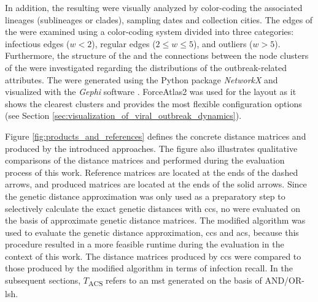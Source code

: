 In addition, the resulting  were visually analyzed by color-coding the associated lineages (sublineages or clades), sampling dates and collection cities. The edges of the  were examined using a color-coding system divided into three categories: infectious edges ($w < 2$), regular edges ($2 \leq w \leq 5$), and outliers ($w > 5$). Furthermore, the structure of the  and the connections between the node clusters of the  were investigated regarding the distributions of the outbreak-related attributes. The  were generated using the Python package \textit{NetworkX} \cite{Net1} and visualized with the \textit{Gephi} software \cite{Gep1}. ForceAtlas2 was used for the layout as it shows the clearest clusters and provides the most flexible configuration options (see Section \ref{sec:visualization_of_viral_outbreak_dynamics}).

Figure \ref{fig:products_and_references} defines the concrete distance matrices and  produced by the introduced approaches. The figure also illustrates qualitative comparisons of the distance matrices and  performed during the evaluation process of this work. Reference matrices are located at the ends of the dashed arrows, and produced matrices are located at the ends of the solid arrows.
Since the genetic distance approximation was only used as a preparatory step to selectively calculate the exact genetic distances with \acrshort{ccs}, no  were evaluated on the basis of approximate genetic distance matrices. The modified algorithm was used to evaluate the genetic distance approximation, \acrshort{ccs} and \acrshort{acs}, because this procedure resulted in a more feasible runtime during the evaluation in the context of this work.
The distance matrices produced by \acrshort{ccs} were compared to those produced by the modified algorithm in terms of infection recall. In the subsequent sections, $T$\textsubscript{ACS} refers to an \acrshort{mst} generated on the basis of AND/OR-\acrshort{lsh}.

